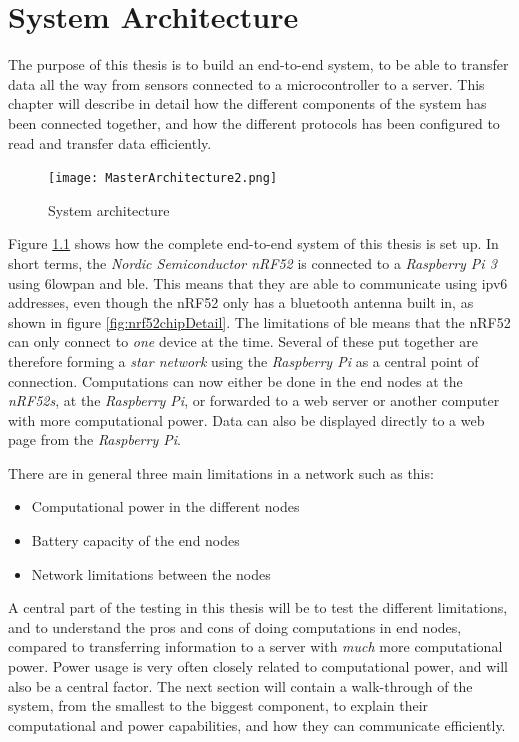 \chapter{System Architecture}
\label{chp:architecture} 

The purpose of this thesis is to build an end-to-end system, to be able to transfer data all the way from sensors connected to a microcontroller to a server. This chapter will describe in detail how the different components of the system has been connected together, and how the different protocols has been configured to read and transfer data efficiently. 


\begin{figure}[ht]
    \centering
    \texttt{[image: MasterArchitecture2.png]}    
    \caption{System architecture}
    \label{fig:systemArchitecture}
\end{figure}

Figure \ref{fig:systemArchitecture} shows how the complete end-to-end system of this thesis is set up. In short terms, the \textit{Nordic Semiconductor nRF52} is connected to a  \textit{Raspberry Pi 3} using \gls{6lowpan} and \gls{ble}. This means that they are able to communicate using \gls{ipv6} addresses, even though the nRF52 only has a bluetooth antenna built in, as shown in figure \ref{fig:nrf52chipDetail}. The limitations of \gls{ble} means that the nRF52 can only connect to \textit{one} device at the time. Several of these put together are therefore forming a \textit{star network} using the \textit{Raspberry Pi} as a central point of connection. Computations can now either be done in the end nodes at the \textit{nRF52s}, at the \textit{Raspberry Pi}, or forwarded to a web server or another computer with more computational power. Data can also be displayed directly to a web page from the \textit{Raspberry Pi}. 
 

There are in general three main limitations in a network such as this:

\renewcommand{\labelitemi}{$\textasteriskcentered$}
\begin{itemize}
  \item Computational power in the different nodes
  \item Battery capacity of the end nodes
  \item Network limitations between the nodes
\end{itemize}

A central part of the testing in this thesis will be to test the different limitations, and to understand the pros and cons of doing computations in end nodes, compared to transferring information to a server with \textit{much} more computational power. Power usage is very often closely related to computational power, and will also be a central factor. The next section will contain a walk-through of the system, from the smallest to the biggest component, to explain their computational and power capabilities, and how they can communicate efficiently. 

